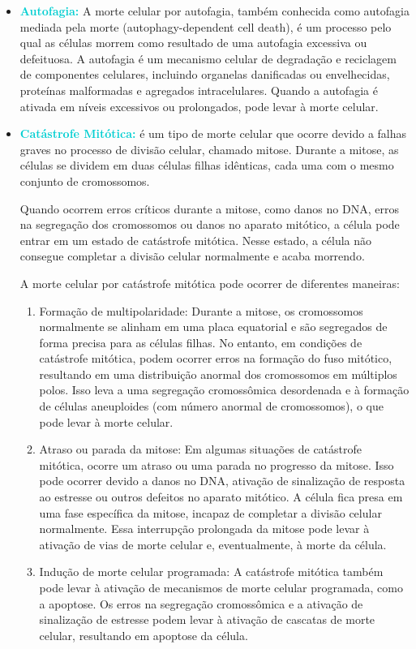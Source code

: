 \documentclass[11pt,a4paper]{article}
\begin{document}
\begin{itemize}
			\item \textcolor{DarkTurquoise}{\textbf{Autofagia:}} A morte celular por autofagia, também conhecida como autofagia mediada pela morte (autophagy-dependent cell death), é um processo pelo qual as células morrem como resultado de uma autofagia excessiva ou defeituosa. A autofagia é um mecanismo celular de degradação e reciclagem de componentes celulares, incluindo organelas danificadas ou envelhecidas, proteínas malformadas e agregados intracelulares. Quando a autofagia é ativada em níveis excessivos ou prolongados, pode levar à morte celular.
			\item \textcolor{DarkTurquoise}{\textbf{Catástrofe Mitótica:}} é um tipo de morte celular que ocorre devido a falhas graves no processo de divisão celular, chamado mitose. Durante a mitose, as células se dividem em duas células filhas idênticas, cada uma com o mesmo conjunto de cromossomos.

			Quando ocorrem erros críticos durante a mitose, como danos no DNA, erros na segregação dos cromossomos ou danos no aparato mitótico, a célula pode entrar em um estado de catástrofe mitótica. Nesse estado, a célula não consegue completar a divisão celular normalmente e acaba morrendo.
			
			A morte celular por catástrofe mitótica pode ocorrer de diferentes maneiras:
			\begin{enumerate}
				\item Formação de multipolaridade: Durante a mitose, os cromossomos normalmente se alinham em uma placa equatorial e são segregados de forma precisa para as células filhas. No entanto, em condições de catástrofe mitótica, podem ocorrer erros na formação do fuso mitótico, resultando em uma distribuição anormal dos cromossomos em múltiplos polos. Isso leva a uma segregação cromossômica desordenada e à formação de células aneuploides (com número anormal de cromossomos), o que pode levar à morte celular.
				\item Atraso ou parada da mitose: Em algumas situações de catástrofe mitótica, ocorre um atraso ou uma parada no progresso da mitose. Isso pode ocorrer devido a danos no DNA, ativação de sinalização de resposta ao estresse ou outros defeitos no aparato mitótico. A célula fica presa em uma fase específica da mitose, incapaz de completar a divisão celular normalmente. Essa interrupção prolongada da mitose pode levar à ativação de vias de morte celular e, eventualmente, à morte da célula.
				\item Indução de morte celular programada: A catástrofe mitótica também pode levar à ativação de mecanismos de morte celular programada, como a apoptose. Os erros na segregação cromossômica e a ativação de sinalização de estresse podem levar à ativação de cascatas de morte celular, resultando em apoptose da célula.
			\end{enumerate}
			

\end{itemize}
\end{document}

